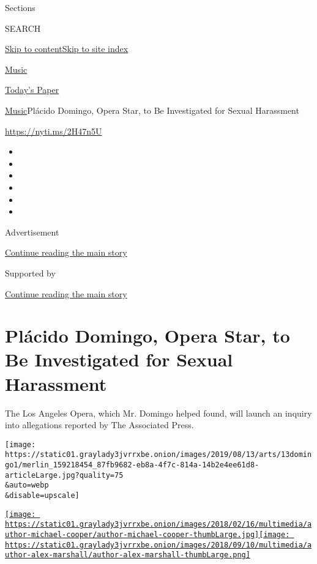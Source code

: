 Sections

SEARCH

\protect\hyperlink{site-content}{Skip to
content}\protect\hyperlink{site-index}{Skip to site index}

\href{https://www.nytimes3xbfgragh.onion/section/arts/music}{Music}

\href{https://myaccount.nytimes3xbfgragh.onion/auth/login?response_type=cookie\&client_id=vi}{}

\href{https://www.nytimes3xbfgragh.onion/section/todayspaper}{Today's
Paper}

\href{/section/arts/music}{Music}\textbar{}Plácido Domingo, Opera Star,
to Be Investigated for Sexual Harassment

\url{https://nyti.ms/2H47n5U}

\begin{itemize}
\item
\item
\item
\item
\item
\item
\end{itemize}

Advertisement

\protect\hyperlink{after-top}{Continue reading the main story}

Supported by

\protect\hyperlink{after-sponsor}{Continue reading the main story}

\hypertarget{pluxe1cido-domingo-opera-star-to-be-investigated-for-sexual-harassment}{%
\section{Plácido Domingo, Opera Star, to Be Investigated for Sexual
Harassment}\label{pluxe1cido-domingo-opera-star-to-be-investigated-for-sexual-harassment}}

The Los Angeles Opera, which Mr. Domingo helped found, will launch an
inquiry into allegations reported by The Associated Press.

\texttt{[image: https://static01.graylady3jvrrxbe.onion/images/2019/08/13/arts/13domingo1/merlin\_159218454\_87fb9682-eb8a-4f7c-814a-14b2e4ee61d8-articleLarge.jpg?quality=75\\\&auto=webp\\\&disable=upscale]}

\href{https://www.nytimes3xbfgragh.onion/by/michael-cooper}{\texttt{[image: https://static01.graylady3jvrrxbe.onion/images/2018/02/16/multimedia/author-michael-cooper/author-michael-cooper-thumbLarge.jpg]}}\href{https://www.nytimes3xbfgragh.onion/by/alex-marshall}{\texttt{[image: https://static01.graylady3jvrrxbe.onion/images/2018/09/10/multimedia/author-alex-marshall/author-alex-marshall-thumbLarge.png]}}

